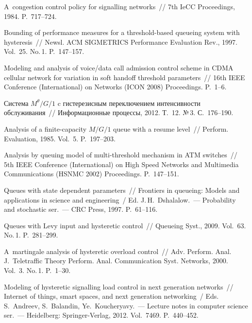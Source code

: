 \begin{multicols}{2}
{{\begin{thebibliography}{99}
A~congestion control policy for signalling networks~//
7th IeCC Proceedings, 1984. P.~717--724.

 Bounding of performance measures
for a threshold-based queueing system with hysteresis~// Newsl.
ACM SIGMETRICS Performance Evaluation Rev., 1997. Vol.~25. No.\,1. P.~147--157.

 Modeling and analysis of voice/data call
admission control scheme in CDMA cellular network for variation in
soft handoff threshold parameters~// 16th IEEE
 Conference (International) on Networks (ICON 2008) Proceedings. P.~1--6.

Система $M^\theta/G/1$ c гистерезисным
переключением интенсивности обслуживания~// Информационные процессы, 2012. Т.~12. №\,3. С.~176--190.

Analysis of a finite-capacity $M/G/1$ queue with a resume level~//
Perform. Evaluation, 1985. Vol.~5. P.~197--203.

 Analysis by queuing model of
multi-threshold mechanism in ATM switches~// 5th
IEEE  Conference (International) on High Speed Networks and Multimedia
Communications (HSNMC 2002) Proceedings. P.~147--151.

Queues with state dependent parameters~//
Frontiers in queueing: Models and applications in
science and engineering~/ Ed. J.\,H.~Dshalalow.~--- Probability and stochastic ser.~---
CRC Press, 1997. P.~61--116.

Queues with Levy input and hysteretic control~//
Queueing Syst., 2009. Vol.~63. No.\,1. P.~281--299.

A~martingale analysis of hysteretic overload control~//
Adv. Perform. Anal. J.~Teletraffic Theory Perform. Anal.
Communication Syst. Networks, 2000.
Vol.~3. No.\,1. P.~1--30.

Modeling of hysteretic signalling load control
in next generation \mbox{networks}~// Internet of things, smart spaces, and
next generation networking~/ Eds. S.~Andreev, S.~Balandin, Ye.~Koucheryavy.~---
Lecture notes in computer science ser.~--- 
Heidelberg: Springer-Verlag, 2012. Vol.~7469. P.~440--452.


\end{thebibliography}}}
\end{multicols}
